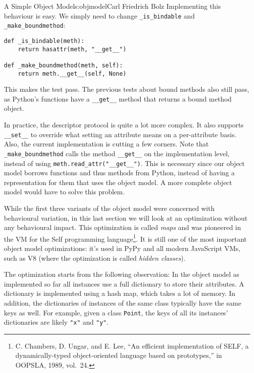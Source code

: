 \begin{aosachapter}{A Simple Object Model}{s:objmodel}{Carl Friedrich Bolz}
Implementing this behaviour is easy. We simply need to change
\texttt{\_is\_bindable} and \newline \texttt{\_make\_boundmethod}:

\begin{verbatim}
def _is_bindable(meth):
    return hasattr(meth, "__get__")

def _make_boundmethod(meth, self):
    return meth.__get__(self, None)
\end{verbatim}

This makes the test pass. The previous tests about bound methods also
still pass, as Python's functions have a \texttt{\_\_get\_\_} method
that returns a bound method object.

In practice, the descriptor protocol is quite a lot more complex. It
also supports \texttt{\_\_set\_\_} to override what setting an attribute
means on a per-attribute basis. Also, the current implementation is
cutting a few corners. Note that \texttt{\_make\_boundmethod} calls the
method \texttt{\_\_get\_\_} on the implementation level, instead of
using \texttt{meth.read\_attr("\_\_get\_\_")}. This is necessary since
our object model borrows functions and thus methods from Python, instead
of having a representation for them that uses the object model. A more
complete object model would have to solve this problem.

\label{instance-optimization}

While the first three variants of the object model were concerned with
behavioural variation, in this last section we will look at an
optimization without any behavioural impact. This optimization is called
\emph{maps} and was pioneered in the VM for the Self programming
language\footnote{C. Chambers, D. Ungar, and E. Lee, ``An efficient
  implementation of SELF, a dynamically-typed object-oriented language
  based on prototypes,'' in OOPSLA, 1989, vol.~24.}. It is still one of
the most important object model optimizations: it's used in PyPy and all
modern JavaScript VMs, such as V8 (where the optimization is called
\emph{hidden classes}).

The optimization starts from the following observation: In the object
model as implemented so far all instances use a full dictionary to store
their attributes. A dictionary is implemented using a hash map, which
takes a lot of memory. In addition, the dictionaries of instances of the
same class typically have the same keys as well. For example, given a
class \texttt{Point}, the keys of all its instances' dictionaries are
likely \texttt{"x"} and \texttt{"y"}.


\end{aosachapter}
